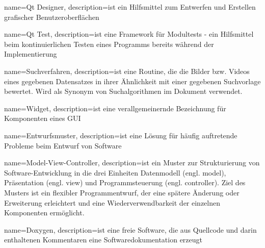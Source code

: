 {
name=Qt Designer,
description={ist ein Hilfsmittel zum Entwerfen und Erstellen grafischer Benutzeroberflächen}
}

{
name=Qt Test,
description={ist eine Framework für Modultests - ein Hilfsmittel beim kontinuierlichen Testen eines Programms bereits während der Implementierung}
}

{
name=Suchverfahren,
description={ist eine Routine, die die Bilder bzw. Videos eines gegebenen Datensatzes in ihrer Ähnlichkeit mit einer gegebenen Suchvorlage bewertet. \newline Wird als Synonym von Suchalgorithmen im Dokument verwendet.}
}

{
name=Widget,
description={ist eine verallgemeinernde Bezeichnung für Komponenten eines GUI}
}

{
name=Entwurfsmuster,
description={ist eine Lösung für häufig auftretende Probleme beim Entwurf von Software}
}

{
name=Model-View-Controller,
description={ist ein Muster zur Strukturierung von Software-Entwicklung in die drei Einheiten Datenmodell (engl. model), Präsentation (engl. view) und Programmsteuerung (engl. controller). Ziel des Musters ist ein flexibler Programmentwurf, der eine spätere Änderung oder Erweiterung erleichtert und eine Wiederverwendbarkeit der einzelnen Komponenten ermöglicht.}
}

{
name=Doxygen,
description={ist eine freie Software, die aus Quellcode und darin enthaltenen Kommentaren eine Softwaredokumentation erzeugt}
}

